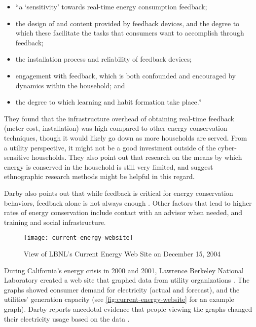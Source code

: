 \begin{itemize}
	\item ``a `sensitivity' towards real-time energy consumption feedback;
	\item the design of and content provided by feedback devices, and the degree to which these facilitate the tasks that consumers want to accomplish through feedback;
	\item the installation process and reliability of feedback devices;
	\item engagement with feedback, which is both confounded and encouraged by dynamics within the household; and
	\item the degree to which learning and habit formation take place.''
\end{itemize}

They found that the infrastructure overhead of obtaining real-time feedback (meter cost, installation) was high compared to other energy conservation techniques, though it would likely go down as more households are served. From a utility perspective, it might not be a good investment outside of the cyber-sensitive households. They also point out that research on the means by which energy is conserved in the household is still very limited, and suggest ethnographic research methods might be helpful in this regard.

Darby also points out that while feedback is critical for energy conservation behaviors, feedback alone is not always enough \cite{darby-2000-making-it-obvious}. Other factors that lead to higher rates of energy conservation include contact with an advisor when needed, and training and social infrastructure.

\begin{figure}[htbp]
	\centering
		\texttt{[image: current-energy-website]}
		\caption{View of LBNL's Current Energy Web Site on December 15, 2004}
		\label{fig:current-energy-website}
\end{figure}

During California's energy crisis in 2000 and 2001, Lawrence Berkeley National Laboratory created a web site that graphed data from utility organizations \cite{Bartholomew2008Current-Energy}. The graphs showed consumer demand for electricity (actual and forecast), and the utilities' generation capacity (see \autoref{fig:current-energy-website} for an example graph). Darby reports anecdotal evidence that people viewing the graphs changed their electricity usage based on the data \cite{darby-review-2006}.

